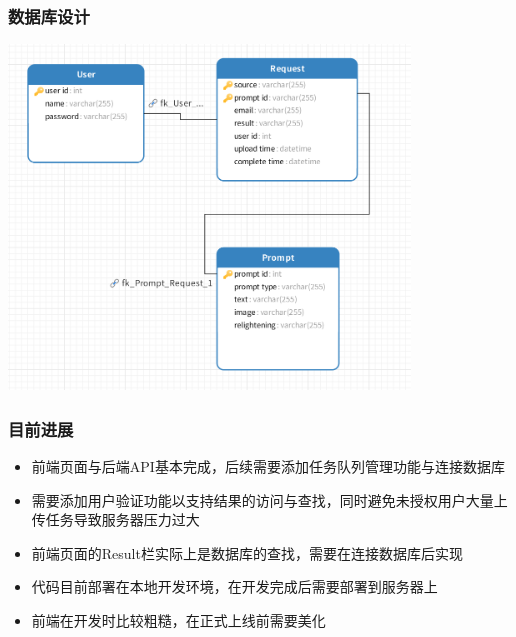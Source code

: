 \documentclass{beamer}
\begin{document}
\begin{frame}
    \frametitle{数据库设计}
    \includegraphics[width=0.8\textwidth]{pic3.png}
\end{frame}

\begin{frame}
    \frametitle{目前进展}
    \begin{itemize}
        \item 前端页面与后端API基本完成，后续需要添加任务队列管理功能与连接数据库
        \item 需要添加用户验证功能以支持结果的访问与查找，同时避免未授权用户大量上传任务导致服务器压力过大
        \item 前端页面的Result栏实际上是数据库的查找，需要在连接数据库后实现
        \item 代码目前部署在本地开发环境，在开发完成后需要部署到服务器上
        \item 前端在开发时比较粗糙，在正式上线前需要美化
    \end{itemize}

\end{frame}
\end{document}
